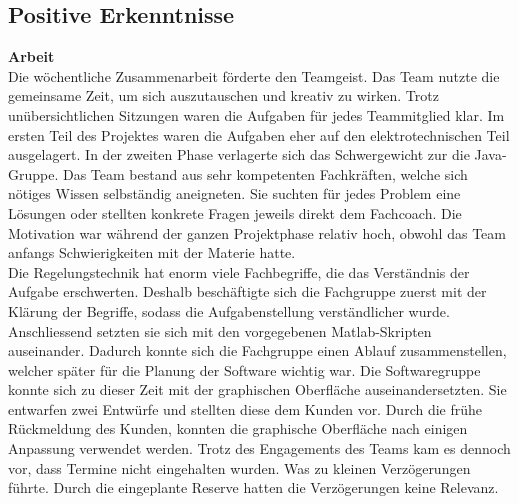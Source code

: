 \subsection{Positive Erkenntnisse}
\textbf{Arbeit}\\
Die wöchentliche Zusammenarbeit förderte den Teamgeist. Das Team nutzte die gemeinsame Zeit, um sich auszutauschen und kreativ zu wirken. Trotz unübersichtlichen Sitzungen waren die Aufgaben für jedes Teammitglied klar. Im ersten Teil des Projektes waren die Aufgaben eher auf den elektrotechnischen Teil ausgelagert. In der zweiten Phase verlagerte sich das Schwergewicht zur die Java-Gruppe. Das Team bestand aus sehr kompetenten Fachkräften, welche sich nötiges Wissen selbständig aneigneten. Sie suchten für jedes Problem eine Lösungen oder stellten konkrete Fragen jeweils direkt dem Fachcoach. Die Motivation war während der ganzen Projektphase relativ hoch, obwohl das Team anfangs Schwierigkeiten mit der Materie hatte.\\ 
Die Regelungstechnik hat enorm viele Fachbegriffe, die das Verständnis der Aufgabe erschwerten. Deshalb beschäftigte sich die Fachgruppe zuerst mit der Klärung der Begriffe, sodass die Aufgabenstellung verständlicher wurde. Anschliessend setzten sie sich mit den vorgegebenen Matlab-Skripten auseinander. Dadurch konnte sich die Fachgruppe einen Ablauf zusammenstellen, welcher später für die Planung der Software wichtig war. Die Softwaregruppe konnte sich zu dieser Zeit mit der graphischen Oberfläche auseinandersetzten. Sie entwarfen zwei Entwürfe und stellten diese dem Kunden vor. Durch die frühe Rückmeldung des Kunden, konnten die graphische Oberfläche nach einigen Anpassung verwendet werden.
Trotz des Engagements des Teams kam es dennoch vor, dass Termine nicht eingehalten wurden. Was zu kleinen Verzögerungen führte. Durch die eingeplante Reserve hatten die Verzögerungen keine Relevanz.\\ 

